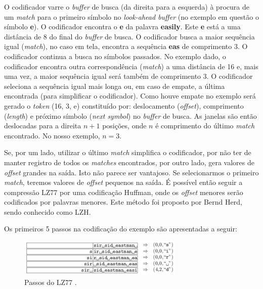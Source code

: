\begin{frame}[allowframebreaks]
  \framebreak

  O codificador varre o \textit{buffer} de busca (da direita para a esquerda) à procura
  de um \textit{match} para o primeiro símbolo no \textit{look-ahead buffer} (no exemplo em questão o símbolo \textbf{e}).
  O codificador encontra o \textbf{e} da palavra \textbf{easily}. Este \textbf{e} está a uma distância
  de 8 do final do \textit{buffer} de busca. O codificador busca a maior sequência igual (\textit{match}), no
  caso em tela, encontra a sequência \textbf{eas} de comprimento 3. O codificador continua a busca 
  no símbolos passados. No exemplo dado, o codificador encontra outra correspondência (\textit{match}) 
  a uma distância de 16 e, mais uma vez, a maior sequência igual será também de comprimento 3.
  O codificador seleciona a sequência igual mais longa ou, em caso de empate, a última encontrada (para simplificar o codificador).
  Como houve empate no exemplo será gerado o \textit{token} (16, 3, e) constituído por:
  deslocamento (\textit{offset}), comprimento (\textit{length}) e próximo símbolo (\textit{next symbol}) no
  \textit{buffer} de busca.
  As janelas são então deslocadas para a direita $n+1$ posições, onde $n$ é comprimento do último \textit{match} encontrado.
  No nosso exemplo, $n=3$.

  \framebreak

  Se, por um lado, utilizar o último \textit{match} simplifica o codificador, por não ter de manter registro de 
  todos os \textit{matches} encontrados, por outro lado, gera valores de \textit{offset} grandes na saída.
  Isto não parece ser vantajoso. Se selecionarmos o primeiro \textit{match}, teremos valores de \textit{offset}
  pequenos na saída. É possível então seguir a compressão LZ77 por uma codificação Huffman, onde os \textit{offset} menores
  serão codificados por palavras menores. Este método foi proposto por Bernd Herd, sendo conhecido como LZH.

  \framebreak

  Os primeiros 5 passos na codificação do exemplo são apresentadas a seguir:
  \begin{figure}[h!]
  \centering
  \includegraphics[width=0.7\textwidth]{images/lz77_5steps.png}
  \caption{Passos do LZ77 \citep{salomon2007}.}
  \label{fig:lz77_5steps}
  \end{figure}


\end{frame}
